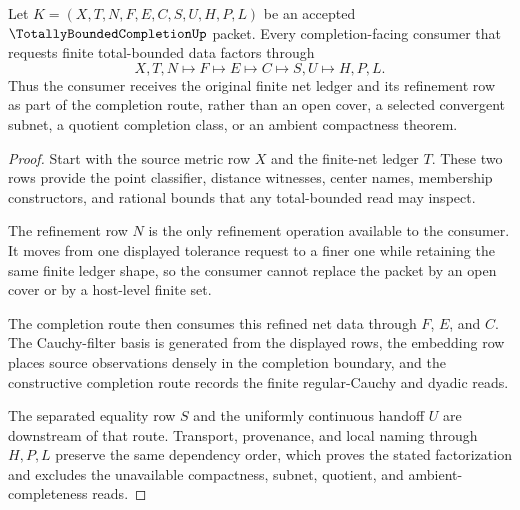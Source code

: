 \begin{theorem}
\label{thm:totally-bounded-completion-net-handoff}
Let $K=(X,T,N,F,E,C,S,U,H,P,L)$ be an accepted $\TotallyBoundedCompletionUp$ packet. Every completion-facing consumer that requests finite total-bounded data factors through
$$
X,T,N \longmapsto F \longmapsto E \longmapsto C \longmapsto S,U \longmapsto H,P,L .
$$
Thus the consumer receives the original finite net ledger and its refinement row as part of the completion route, rather than an open cover, a selected convergent subnet, a quotient completion class, or an ambient compactness theorem.
\end{theorem}
\begin{proof}
Start with the source metric row $X$ and the finite-net ledger $T$. These two rows provide the point classifier, distance witnesses, center names, membership constructors, and rational bounds that any total-bounded read may inspect.

The refinement row $N$ is the only refinement operation available to the consumer. It moves from one displayed tolerance request to a finer one while retaining the same finite ledger shape, so the consumer cannot replace the packet by an open cover or by a host-level finite set.

The completion route then consumes this refined net data through $F$, $E$, and $C$. The Cauchy-filter basis is generated from the displayed rows, the embedding row places source observations densely in the completion boundary, and the constructive completion route records the finite regular-Cauchy and dyadic reads.

The separated equality row $S$ and the uniformly continuous handoff $U$ are downstream of that route. Transport, provenance, and local naming through $H,P,L$ preserve the same dependency order, which proves the stated factorization and excludes the unavailable compactness, subnet, quotient, and ambient-completeness reads.
\end{proof}

